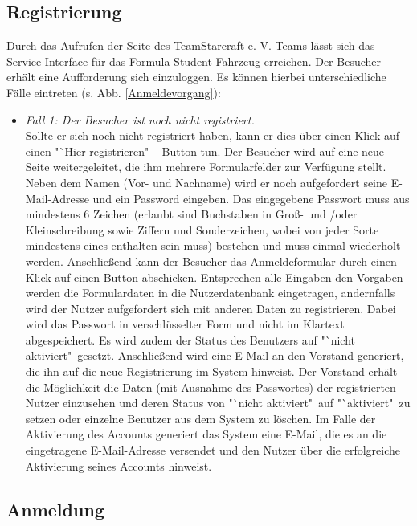\documentclass[fontsize = 12pt, paper = a4]{scrreprt}
\begin{document}
\newpage

\subsection{Registrierung}

Durch das Aufrufen der Seite des TeamStarcraft e. V. Teams lässt sich das Service Interface für das Formula Student Fahrzeug erreichen. Der Besucher erhält eine Aufforderung sich einzuloggen. Es können hierbei unterschiedliche Fälle eintreten (s. Abb. \ref{Anmeldevorgang}): 

\begin{itemize}

\item \textit{Fall 1: Der Besucher ist noch nicht registriert.} \\
Sollte er sich noch nicht registriert haben, kann er dies über einen Klick auf einen "`Hier registrieren"\ - Button tun. Der Besucher wird auf eine neue Seite weitergeleitet, die ihm mehrere Formularfelder zur Verfügung stellt. Neben dem Namen (Vor- und Nachname) wird er noch aufgefordert seine E-Mail-Adresse und ein Password eingeben. Das eingegebene Passwort muss aus mindestens 6 Zeichen (erlaubt sind Buchstaben in Groß- und /oder Kleinschreibung sowie Ziffern und Sonderzeichen, wobei von jeder Sorte mindestens eines enthalten sein muss) bestehen und muss einmal wiederholt werden. Anschließend kann der Besucher das Anmeldeformular durch einen Klick auf einen Button abschicken. Entsprechen alle Eingaben den Vorgaben werden die Formulardaten in die Nutzerdatenbank eingetragen, andernfalls wird der Nutzer aufgefordert sich mit anderen Daten zu registrieren. Dabei wird das Passwort in verschlüsselter Form und nicht im Klartext abgespeichert. Es wird zudem der Status des Benutzers auf "`nicht aktiviert"\ gesetzt. Anschließend wird eine E-Mail an den Vorstand generiert, die ihn auf die neue Registrierung im System hinweist. Der Vorstand erhält die Möglichkeit die Daten (mit Ausnahme des Passwortes) der registrierten Nutzer einzusehen und deren Status von "`nicht aktiviert"\ auf "`aktiviert"\ zu setzen oder einzelne Benutzer aus dem System zu löschen. Im Falle der Aktivierung des Accounts generiert das System eine E-Mail, die es an die eingetragene E-Mail-Adresse versendet und den Nutzer über die erfolgreiche Aktivierung seines Accounts hinweist.

\end{itemize}

\subsection{Anmeldung}
\end{document}
